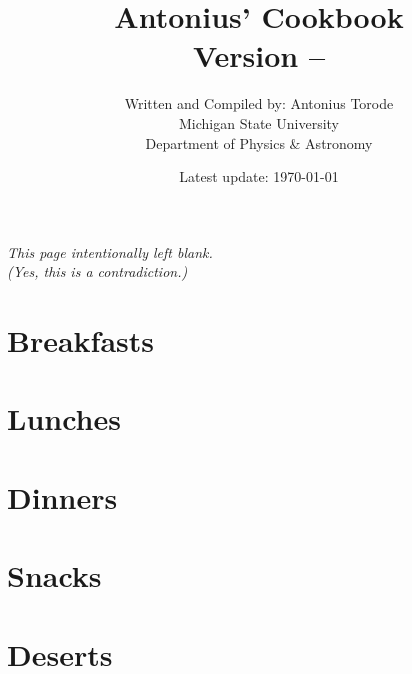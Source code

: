 \documentclass[a4paper,11pt]{book}
\title{{\huge \textbf{Antonius' Cookbook} \\ \textbf{Version -- \Version}} \\ \vspace{1cm}
}
\author{Written and Compiled by: Antonius Torode \\ Michigan State University \\ Department of Physics \& Astronomy}
\date{Latest update: \today}
\begin{document}
	
\AddToShipoutPicture*{\CoverPic}

\setlength{\parindent}{0pt}
\frontmatter
\clearpage
\maketitle

\tableofcontents
\newpage
\vspace*{\fill}
\begin{center}
	\textit{This page intentionally left blank. \\ (Yes, this is a contradiction.)}
\end{center}
\vspace*{\fill}

\mainmatter
\pagestyle{fancy}
\chapter{Breakfasts}




\chapter{Lunches}






\chapter{Dinners}






\chapter{Snacks}




\chapter{Deserts}




\backmatter
\end{document}
